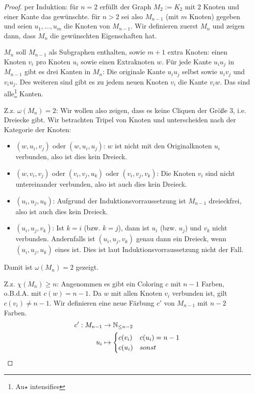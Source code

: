 \documentclass[../main.tex]{subfiles}
\begin{document}
\begin{proof}
    per Induktion: für $n = 2$ erfüllt der Graph $M_2 := K_2$ mit 2 Knoten und einer Kante das gewünschte.
    für $n > 2$ sei also $M_{n-1}$ (mit $m$ Knoten) gegeben und seien $u_1, \hdots, u_m$ die Knoten von $M_{n-1}$. Wir definieren zuerst $M_n$ und zeigen dann, dass $M_n$ die gewünschten Eigenschaften hat.

    $M_n$ soll $M_{n-1}$ als Subgraphen enthalten, sowie $m+1$ extra Knoten: einen Knoten $v_i$ pro Knoten $u_i$ sowie einen Extraknoten $w$. Für jede Kante $u_iu_j$ in $M_{n-1}$ gibt es drei Kanten in $M_n$: Die originale Kante $u_iu_j$ selbst sowie $u_iv_j$ und $v_iu_j$. Des weiteren sind gibt es zu jedem neuen Knoten $v_i$ die Kante $v_iw$. Das sind alle\footnote{Au$\star$ intensifies} Kanten.
    
    Z.z. $\omega(M_n) = 2$: Wir wollen also zeigen, dass es keine Cliquen der Größe 3, i.e. Dreiecke gibt. Wir betrachten Tripel von Knoten und unterscheiden nach der Kategorie der Knoten:
    \begin{itemize}
        \item $(w, u_i, v_j)$ oder $(w, u_i, u_j)$: $w$ ist nicht mit den Originalknoten $u_i$ verbunden, also ist dies kein Dreieck.
        \item $(w, v_i, v_j)$ oder $(v_i, v_j, u_k)$ oder $(v_i, v_j, v_k)$: Die Knoten $v_i$ sind nicht untereinander verbunden, also ist auch dies kein Dreieck.
        \item $(u_i, u_j, u_k)$: Aufgrund der Induktionsvorraussetzung ist $M_{n-1}$ dreieckfrei, also ist auch dies kein Dreieck.
        \item $(u_i, u_j, v_k)$: Ist $k=i$ (bzw. $k=j$), dann ist $u_i$ (bzw. $u_j$) und $v_k$ nicht verbunden. Andernfalls ist $(u_i, u_j, v_k)$ genau dann ein Dreieck, wenn $(u_i, u_j, u_k)$ eines ist. Dies ist laut Induktionsvorraussetzung nicht der Fall.
    \end{itemize}
    Damit ist $\omega(M_n) = 2$ gezeigt.

    Z.z. $\chi(M_n) \geq n$: Angenommen es gibt ein Coloring $c$ mit $n-1$ Farben, o.B.d.A. mit $c(w) = n-1$. Da $w$ mit allen Knoten $v_i$ verbunden ist, gilt $c(v_i) \neq n-1$. Wir definieren eine neue Färbung $c'$ von $M_{n-1}$ mit $n-2$ Farben.
    \begin{align*}
        c' : M_{n-1} &\to \mathbb{N}_{\leq n-2} \\
        u_i &\mapsto \begin{cases}
            c(v_i) &c(u_i) = n-1 \\
            c(u_i) &sonst
        \end{cases}
    \end{align*}


\end{proof}
\end{document}

